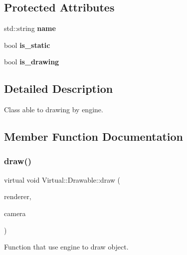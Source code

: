 \subsection*{Protected Attributes}
\begin{DoxyCompactItemize}
\item 
\hypertarget{class_virtual_1_1_drawable_aad83f4ad3292e4aefac9db62fe0d4719}{}\label{class_virtual_1_1_drawable_aad83f4ad3292e4aefac9db62fe0d4719} 
std\+::string {\bfseries name}
\item 
\hypertarget{class_virtual_1_1_drawable_a75aa2adddb490011c1efaea42ab16079}{}\label{class_virtual_1_1_drawable_a75aa2adddb490011c1efaea42ab16079} 
bool {\bfseries is\+\_\+static}
\item 
\hypertarget{class_virtual_1_1_drawable_a360d6ddca18c7f4f6699662ba4102c2a}{}\label{class_virtual_1_1_drawable_a360d6ddca18c7f4f6699662ba4102c2a} 
bool {\bfseries is\+\_\+drawing}
\end{DoxyCompactItemize}


\subsection{Detailed Description}
Class able to drawing by engine. 

\subsection{Member Function Documentation}
\hypertarget{class_virtual_1_1_drawable_af7014800911efa59b96e538149e56f8b}{}\label{class_virtual_1_1_drawable_af7014800911efa59b96e538149e56f8b} 
\subsubsection{\texorpdfstring{draw()}{draw()}}
{\footnotesize\ttfamily virtual void Virtual\+::\+Drawable\+::draw (\begin{DoxyParamCaption}\item[{S\+D\+L\+\_\+\+Renderer $\ast$}]{renderer,  }\item[{\hyperlink{class_virtual_1_1_camera}{Camera} \&}]{camera }\end{DoxyParamCaption})\hspace{0.3cm}{\ttfamily [pure virtual]}}



Function that use engine to draw object. 


